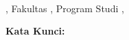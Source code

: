 {%
	
    \begin{center}
        \namaMahasiswa \\
        \texttt{\emailref{\emailKorespondensi}}
        
        \textbf{\MakeUppercase{\judul}}
        
        \daerahKampus, Fakultas \fakultas, Program Studi \prodi, \tahun
    \end{center}
    
    \vspace{0.4cm}
    
    \noindent\abstrak
    
    \vspace{0.4cm}
    
    \noindent\textbf{Kata Kunci:} \kataKunci
}

\newpage